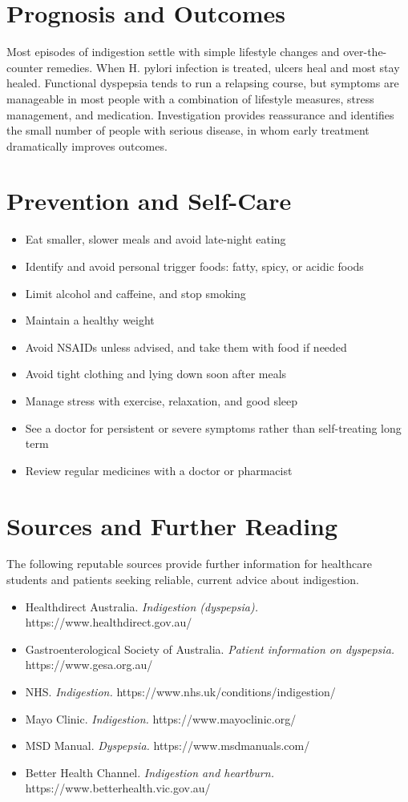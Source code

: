 \section*{Prognosis and Outcomes}
Most episodes of indigestion settle with simple lifestyle changes and over-the-counter remedies. When H. pylori infection is treated, ulcers heal and most stay healed. Functional dyspepsia tends to run a relapsing course, but symptoms are manageable in most people with a combination of lifestyle measures, stress management, and medication. Investigation provides reassurance and identifies the small number of people with serious disease, in whom early treatment dramatically improves outcomes.

\section*{Prevention and Self-Care}
\begin{itemize}
    \item Eat smaller, slower meals and avoid late-night eating
    \item Identify and avoid personal trigger foods: fatty, spicy, or acidic foods
    \item Limit alcohol and caffeine, and stop smoking
    \item Maintain a healthy weight
    \item Avoid NSAIDs unless advised, and take them with food if needed
    \item Avoid tight clothing and lying down soon after meals
    \item Manage stress with exercise, relaxation, and good sleep
    \item See a doctor for persistent or severe symptoms rather than self-treating long term
    \item Review regular medicines with a doctor or pharmacist
\end{itemize}

\section*{Sources and Further Reading}
The following reputable sources provide further information for healthcare students and patients seeking reliable, current advice about indigestion.
\begin{itemize}
    \item Healthdirect Australia. \textit{Indigestion (dyspepsia).} https://www.healthdirect.gov.au/
    \item Gastroenterological Society of Australia. \textit{Patient information on dyspepsia.} https://www.gesa.org.au/
    \item NHS. \textit{Indigestion.} https://www.nhs.uk/conditions/indigestion/
    \item Mayo Clinic. \textit{Indigestion.} https://www.mayoclinic.org/
    \item MSD Manual. \textit{Dyspepsia.} https://www.msdmanuals.com/
    \item Better Health Channel. \textit{Indigestion and heartburn.} https://www.betterhealth.vic.gov.au/
\end{itemize}
